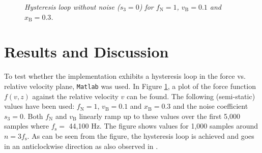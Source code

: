 \documentclass[twoside,a4paper,dvipsnames]{article}
\begin{document}
\begin{figure}[h]
  \centering
  \caption{\it Hysteresis loop without noise ($s_3 = 0$) for $f_\text{N} = 1$, $v_\text{B} = 0.1$ and $x_\text{B} = 0.3$. \label{fig:hysteresis}}
\end{figure}

\section{Results and Discussion}\label{sec:results}
To test whether the implementation exhibits a hysteresis loop in the force vs. relative velocity plane, \texttt{Matlab} was used. In Figure \ref{fig:hysteresis}, a plot of the force function $f(v,z)$ against the relative velocity $v$ can be found.  The following (semi-static) values have been used: $f_\text{N} = 1$, $v_\text{B} = 0.1$ and $x_\text{B} = 0.3$ and the noise coefficient $s_3=0$. Both $f_\text{N}$ and $v_\text{B}$ linearly ramp up to these values over the first 5,000 samples where $f_\text{s} =$ 44,100 Hz. The figure shows values for 1,000 samples around $n = 3f_\text{s}$. As can be seen from the figure, the hysteresis loop is achieved and goes in an anticlockwise direction as also observed in \cite{Smith2000}.
\end{document}
